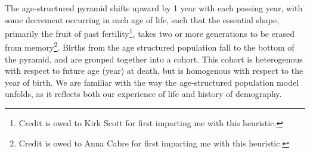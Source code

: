The age-structured pyramid shifts upward by 1 year with
each passing year, with some decrement occurring in each age of life, such that
the essential shape, primarily the fruit of past fertility\footnote{Credit is
owed to Kirk Scott for first imparting me with this heuristic.}, takes two or
more generations to be erased from memory\footnote{Credit is
owed to Anna Cabre for first imparting me with this heuristic.}. Births from the
age structured population fall to the bottom of the pyramid, and are grouped 
together into a cohort. This cohort is heterogenous with respect to future 
age (year) at death, but is
homogenous with respect to the year of birth. We are familiar with
the way the age-structured population model unfolds, as it
reflects both our experience of life and history of demography.